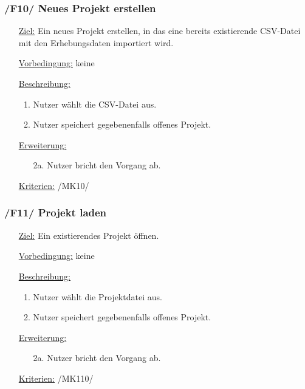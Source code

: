 \documentclass{article}
\begin{document}
\subsubsection*{\textbf{/F10/} Neues Projekt erstellen} \label{sec:f:Neues Projekt erstellen}
\begin{itemize}
    \item[\underline{Ziel:}] Ein neues Projekt erstellen, in das eine bereits existierende CSV-Datei mit den Erhebungsdaten importiert wird.
    \item[\underline{Vorbedingung:}] keine
    \item[\underline{Beschreibung:}]
    \begin{enumerate}
        \item Nutzer wählt die CSV-Datei aus.
        \item Nutzer speichert gegebenenfalls offenes Projekt.
    \end{enumerate}
    \item[\underline{Erweiterung:}]
    \begin{itemize}
        \item[2a.] Nutzer bricht den Vorgang ab.
    \end{itemize}
    \item[\underline{Kriterien:}] /MK10/
\end{itemize}

\subsubsection*{\textbf{/F11/} Projekt laden} \label{sec:f:Projekt laden}
\begin{itemize}
    \item[\underline{Ziel:}] Ein existierendes Projekt öffnen.
    \item[\underline{Vorbedingung:}] keine
    \item[\underline{Beschreibung:}]
    \begin{enumerate}
        \item Nutzer wählt die Projektdatei aus.
        \item Nutzer speichert gegebenenfalls offenes Projekt.
    \end{enumerate}
    \item[\underline{Erweiterung:}]
    \begin{itemize}
        \item[2a.] Nutzer bricht den Vorgang ab.
    \end{itemize}
    \item[\underline{Kriterien:}] /MK110/
\end{itemize}
\end{document}
